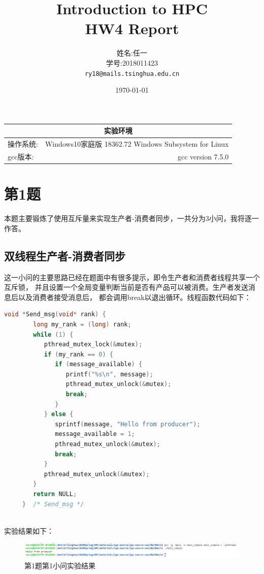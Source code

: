 \documentclass[UTF8]{article}
\title{Introduction to HPC \\ HW4 Report} %
\author{姓名:任一  \\学号:2018011423\\ \texttt{ry18@mails.tsinghua.edu.cn}} %
\date{\today} %
\begin{document}
\maketitle %
\begin{center}
    \begin{tabular}{l  r}
    \hline
        \multicolumn{2}{c}{实验环境} \\ \hline
        操作系统: & Windows10家庭版 18362.72 Windows Subsystem for Linux \\ \hline%
        gcc版本: & gcc version 7.5.0 \\ \hline%
    \end{tabular}
\end{center}
\newpage

\section{第1题}
本题主要锻炼了使用互斥量来实现生产者-消费者同步，一共分为3小问，我将逐一作答。
\subsection{双线程生产者-消费者同步}
这一小问的主要思路已经在题面中有很多提示，即令生产者和消费者线程共享一个互斥锁，
并且设置一个全局变量判断当前是否有产品可以被消费。生产者发送消息后以及消费者接受消息后，
都会调用break以退出循环。线程函数代码如下：

\begin{lstlisting}[language={c}]
    void *Send_msg(void* rank) {
        long my_rank = (long) rank;
        while (1) {
           pthread_mutex_lock(&mutex);
           if (my_rank == 0) {
              if (message_available) {
                 printf("%s\n", message);
                 pthread_mutex_unlock(&mutex);
                 break;
              }
           } else {
              sprintf(message, "Hello from producer");
              message_available = 1;
              pthread_mutex_unlock(&mutex);
              break;
           }
           pthread_mutex_unlock(&mutex);
        }
        return NULL;
     }  /* Send_msg */
     
    \end{lstlisting}
实验结果如下：
\begin{figure}[h]
    \centering
        \includegraphics[width=\textwidth]{1simple.png}
        \caption{第1题第1小问实验结果}
    \end{figure}
\end{document}
